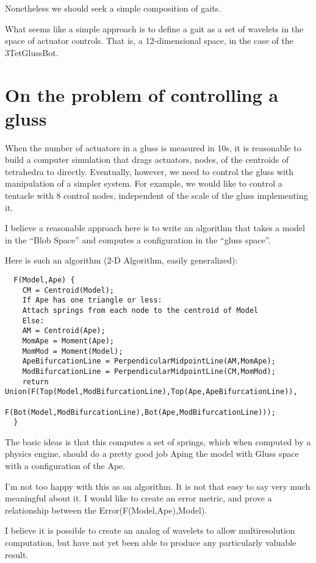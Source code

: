 \documentclass[11pt]{article}
\begin{document}
Nonetheless we should seek a simple composition of gaits.

What seems like a simple approach is to define a gait as a set of wavelets in the space
of actuator controls.  That is, a 12-dimensional space, in the case of the 3TetGlussBot.

\section{On the problem of controlling a gluss}

When the number of actuators in a gluss is measured in 10s, it is reasonable to build a computer simulation
that drags actuators, nodes, of the centroids of tetrahedra to directly.
Eventually, however, we need to control the gluss with manipulation of a simpler system.
For example, we would like to control a tentacle with 8 control nodes, independent of the scale of the
gluss implementing it.

I believe a reasonable approach here is to write an algorithm that takes a model in the ``Blob Space''
and computes a configuration in the ``gluss space''.

Here is such an algorithm (2-D Algorithm, easily generalized):

\begin{lstlisting}
  F(Model,Ape) {
    CM = Centroid(Model);
    If Ape has one triangle or less:
    Attach springs from each node to the centroid of Model
    Else:
    AM = Centroid(Ape);
    MomApe = Moment(Ape);
    MomMod = Moment(Model);
    ApeBifurcationLine = PerpendicularMidpointLine(AM,MomApe);
    ModBifurcationLine = PerpendicularMidpointLine(CM,MomMod);
    return Union(F(Top(Model,ModBifurcationLine),Top(Ape,ApeBifurcationLine)),
                 F(Bot(Model,ModBifurcationLine),Bot(Ape,ModBifurcationLine)));
  }
\end{lstlisting}

The basic ideas is that this computes a set of springs, which when computed by a physics engine, should
do a pretty good job Aping the model with Gluss space with a configuration of the Ape.

I'm not too happy with this as an algorithm. It is not that easy to say very much meaningful about it.
I would like to create an error metric, and prove a relationship between the Error(F(Model,Ape),Model).

I believe it is possible to create an analog of wavelets to allow multiresolution computation, but
have not yet been able to produce any particularly valuable result.
\end{document}
